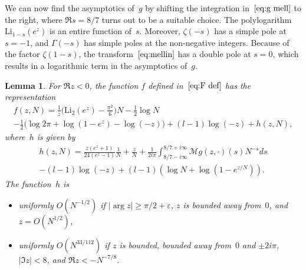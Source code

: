 \documentclass[a4paper]{amsart}
\newtheorem{lemma}[theorem]{Lemma}
\begin{document}
%
We can now find the asymptotics of~$g$ by shifting the integration
in~$\ref{eq:g mell}$ to the right, where $\Re s =8/7$ turns out to
be a suitable choice.
The polylogarithm $\mathrm{Li}_{1-s}(e^z)$ is an entire function of~$s$.
Moreover, $\zeta(-s)$ has a simple pole at $s=-1$, and $\Gamma(-s)$ has simple
poles at the non-negative integers. Because of the factor $\zeta(1-s)$, the
transform~$\ref{eq:mellin}$ has a double pole at  $s=0$, which results in
a logarithmic term in the asymptotics of~$g$.
%
\begin{lemma}\label{le:mellin}
  For $\Re z<0$, the function $f$ defined in~$\ref{eq:F def}$ has the representation
  \begin{multline}\label{eq:f asympt}
     f(z,N) = \frac{1}{z}\Big( \mathrm{Li}_2(e^z) - \frac{\pi^2}{6}\Big)N
   - \frac12 \log N  \\
    - \frac12 \Big(\log 2\pi    +\log(1-e^{z})
 - \log(-z)\Big) +(l-1)\log(-z)+ h(z,N),
 \end{multline}
  where~$h$ is given by
  \begin{multline}\label{eq:h}
    h(z,N) =  \frac{z(e^z+1)}{24(e^z-1)} \frac1N +\frac{z}{N}
      + \frac{1}{2i\pi}\int_{8/7-i\infty}^{8/7+i\infty}  \mathcal{M}g(z,\cdot)(s) N^{-s} ds \\
                -(l-1) \log(-z) + (l-1) (\log N + \log (1-e^{z/N})). 
  \end{multline}
  The function~$h$ is
  \begin{itemize}
    \item[(i)] uniformly $O(N^{-1/2})$ if $|\arg z|\geq \pi/2+\varepsilon$, $z$ is  bounded away
      from~$0$, and $z=O(N^{1/2})$,
    \item[(ii)] uniformly $O(N^{33/112})$ if $z$ is bounded, bounded away from~$0$ and $\pm 2i\pi$,
      $|\Im z|<8$, and $\Re z < -N^{-7/8}$.
  \end{itemize}
\end{lemma}
\end{document}
